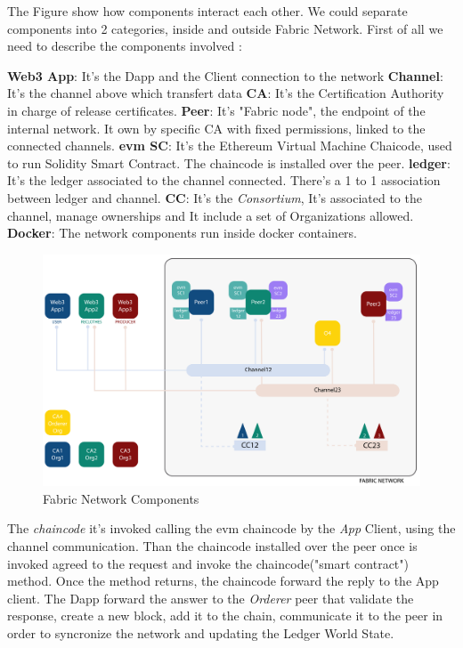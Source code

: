 {The Figure show how components interact each other. We could separate components into 2 categories,
inside and outside Fabric Network. First of all we need to describe the components involved :

\begin{outline}
    \1 \textbf{Web3 App}: It's the Dapp and the Client connection to the network
    \1 \textbf{Channel}: It's the channel above which transfert data 
    \1 \textbf{CA}: It's the Certification Authority in charge of release certificates.
    \1 \textbf{Peer}: It's "Fabric node", the endpoint of the internal network. It own by specific CA with 
    fixed permissions, linked to the connected channels. 
    \1 \textbf{evm SC}: It's the Ethereum Virtual Machine Chaicode, used to run Solidity Smart Contract. The chaincode 
    is installed over the peer.
    \1 \textbf{ledger}: It's the ledger associated to the channel connected. There's a 1 to 1 association 
    between ledger and channel.
    \1 \textbf{CC}: It's the \textit{Consortium}, It's associated to the channel, manage ownerships and 
    It include a set of Organizations allowed. 
    \1 \textbf{Docker}: The network components run inside docker containers. 
\end{outline}

\begin{figure}[h!]
	\centering
	\includegraphics[totalheight=10cm]{img/network.png}
	\caption{Fabric Network Components}
	\label{fig:network}
\end{figure}

The \textit{chaincode} it's invoked calling the evm chaincode by the \textit{App} Client, using the channel communication.
Than the chaincode installed over the peer once is invoked agreed to the request and invoke the chaincode("smart contract")
method. Once the method returns, the chaincode forward the reply to the App client. The Dapp forward the
answer to the \textit{Orderer} peer that validate the response, create a new block, add it to the chain,
communicate it to the peer in order to syncronize the network and updating the Ledger World State.

}
